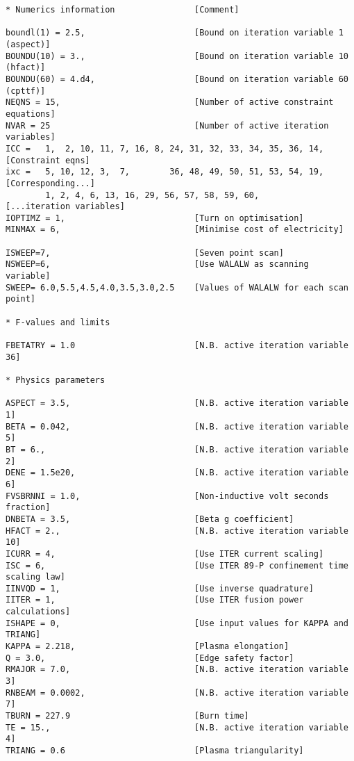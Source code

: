 \documentclass[11pt,a4paper]{report}
\begin{document}
\footnotesize
\begin{verbatim}
* Numerics information                [Comment]

boundl(1) = 2.5,                      [Bound on iteration variable 1 (aspect)]
BOUNDU(10) = 3.,                      [Bound on iteration variable 10 (hfact)]
BOUNDU(60) = 4.d4,                    [Bound on iteration variable 60 (cpttf)]
NEQNS = 15,                           [Number of active constraint equations]
NVAR = 25                             [Number of active iteration variables]
ICC =   1,  2, 10, 11, 7, 16, 8, 24, 31, 32, 33, 34, 35, 36, 14, [Constraint eqns]
ixc =   5, 10, 12, 3,  7,        36, 48, 49, 50, 51, 53, 54, 19, [Corresponding...]
        1, 2, 4, 6, 13, 16, 29, 56, 57, 58, 59, 60,              [...iteration variables]
IOPTIMZ = 1,                          [Turn on optimisation]
MINMAX = 6,                           [Minimise cost of electricity]

ISWEEP=7,                             [Seven point scan]
NSWEEP=6,                             [Use WALALW as scanning variable]
SWEEP= 6.0,5.5,4.5,4.0,3.5,3.0,2.5    [Values of WALALW for each scan point]

* F-values and limits

FBETATRY = 1.0                        [N.B. active iteration variable 36]

* Physics parameters

ASPECT = 3.5,                         [N.B. active iteration variable 1]
BETA = 0.042,                         [N.B. active iteration variable 5]
BT = 6.,                              [N.B. active iteration variable 2]
DENE = 1.5e20,                        [N.B. active iteration variable 6]
FVSBRNNI = 1.0,                       [Non-inductive volt seconds fraction]
DNBETA = 3.5,                         [Beta g coefficient]
HFACT = 2.,                           [N.B. active iteration variable 10]
ICURR = 4,                            [Use ITER current scaling]
ISC = 6,                              [Use ITER 89-P confinement time scaling law]
IINVQD = 1,                           [Use inverse quadrature]
IITER = 1,                            [Use ITER fusion power calculations]
ISHAPE = 0,                           [Use input values for KAPPA and TRIANG]
KAPPA = 2.218,                        [Plasma elongation]
Q = 3.0,                              [Edge safety factor]
RMAJOR = 7.0,                         [N.B. active iteration variable 3]
RNBEAM = 0.0002,                      [N.B. active iteration variable 7]
TBURN = 227.9                         [Burn time]
TE = 15.,                             [N.B. active iteration variable 4]
TRIANG = 0.6                          [Plasma triangularity]


\end{verbatim}
\end{document}
